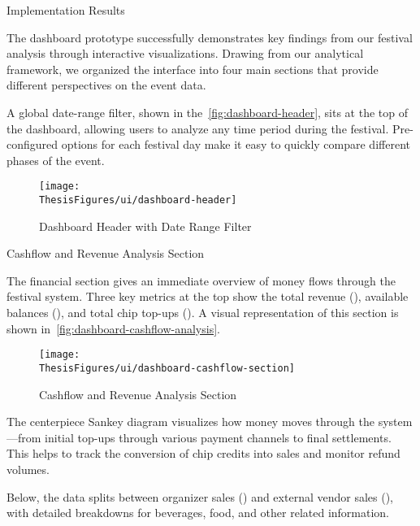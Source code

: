 \begin{section}{Implementation Results}
	\label{sec:implementation-results}

	The dashboard prototype successfully demonstrates key findings from our festival analysis through interactive visualizations.
	Drawing from our analytical framework, we organized the interface into four main sections that provide different perspectives on the event data.

	A global date-range filter, shown in the~\autoref{fig:dashboard-header}, sits at the top of the dashboard, allowing users to analyze any time period during the festival.
	Pre-configured options for each festival day make it easy to quickly compare different phases of the event.

	\begin{figure}[h]
		\centering
		\texttt{[image: \\ThesisFigures/ui/dashboard-header]}
		\caption{Dashboard Header with Date Range Filter}
		\label{fig:dashboard-header}
		\source
	\end{figure}

	\begin{subsection}{Cashflow and Revenue Analysis Section}
		\label{subsec:implementation-results-structure-cashflow}

		The financial section gives an immediate overview of money flows through the festival system.
		Three key metrics at the top show the total revenue (), available balances (), and total chip top-ups ().
		A visual representation of this section is shown in~\autoref{fig:dashboard-cashflow-analysis}.

		\begin{figure}[h]
			\centering
			\texttt{[image: \\ThesisFigures/ui/dashboard-cashflow-section]}
			\caption{Cashflow and Revenue Analysis Section}
			\source
			\label{fig:dashboard-cashflow-analysis}
		\end{figure}

		The centerpiece Sankey diagram visualizes how money moves through the system—from initial top-ups through various payment channels to final settlements.
		This helps to track the conversion of chip credits into sales and monitor refund volumes.

		Below, the data splits between organizer sales () and external vendor sales (), with detailed breakdowns for beverages, food, and other related information.
	\end{subsection}


\end{section}
